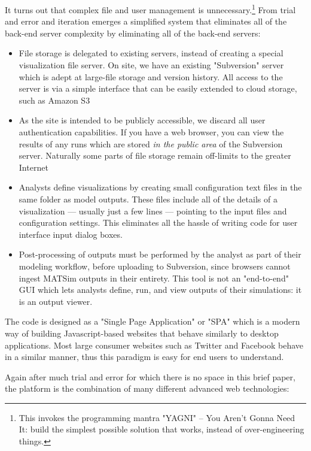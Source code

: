 It turns out that complex file and user management is unnecessary.\footnote{This invokes the programming mantra "YAGNI" -- You Aren't Gonna Need It: build the simplest possible solution that works, instead of over-engineering things.} From trial and error and iteration emerges a simplified system that eliminates all of the back-end server complexity by eliminating all of the back-end servers:

\begin{itemize}
  \item File storage is delegated to existing servers, instead of creating a special visualization file server. On site, we have an existing "Subversion" server \cite{Collins-SussmanEtc2008SubversionBook} which is adept at large-file storage and version history. All access to the server is via a simple interface that can be easily extended to cloud storage, such as Amazon S3
  \item As the site is intended to be publicly accessible, we discard all user authentication capabilities. If you have a web browser, you can view the results of any runs which are stored \emph{in the public area} of the Subversion server. Naturally some parts of file storage remain off-limits to the greater Internet
  \item Analysts define visualizations by creating small configuration text files in the same folder as model outputs. These files include all of the details of a visualization --- usually just a few lines --- pointing to the input files and configuration settings. This eliminates all the hassle of writing code for user interface input dialog boxes.
  \item Post-processing of outputs must be performed by the analyst as part of their modeling workflow, before uploading to Subversion, since browsers cannot ingest MATSim outputs in their entirety. This tool is not an "end-to-end" GUI which lets analysts define, run, and view outputs of their simulations: it is an output viewer.
\end{itemize}

The code is designed as a "Single Page Application" or "SPA" which is a modern way of building Javascript-based websites that behave similarly to desktop applications. Most large consumer websites such as Twitter and Facebook behave in a similar manner, thus this paradigm is easy for end users to understand.

Again after much trial and error for which there is no space in this brief paper, the platform is the combination of many different advanced web technologies:

